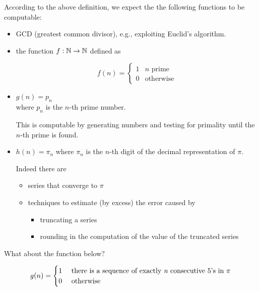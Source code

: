 \begin{example}
  According to the above definition, we expect the the following
  functions to be computable:

  \begin{itemize}

  \item GCD (greatest common divisor), e.g., exploiting Euclid's
    algorithm.

  \item the function $f : \mathbb{N} \to \mathbb{N}$ defined as

    \begin{equation*}
      f(n)=
      \begin{cases}
        1 & n \mbox{ prime} \\
        0 &   \mbox{otherwise}
      \end{cases}
    \end{equation*}

  \item
    $g(n) = p_n$\\
    where $p_n$ is the $n$-th prime number.

    This is computable by generating numbers
    and testing for primality until the $n$-th prime is found.


  \item
    $h(n) = \pi_n$
    where $\pi_n$ is the $n$-th digit of the decimal representation of $\pi$.

    Indeed there are
    \begin{itemize}
    \item series that converge to $\pi$
    \item techniques to estimate (by excess) the error caused by
      \begin{itemize}
      \item truncating a series
      \item rounding in the computation of the value of the truncated series
      \end{itemize}
    \end{itemize}
  \end{itemize}
\end{example}

What about the function below?

\begin{equation*}
  g(n) = \begin{cases}
    1 & $ there is a sequence of exactly  \textit{n} consecutive $5$'s in $ \pi \\
    0 & $ otherwise $
	\end{cases}
\end{equation*}

